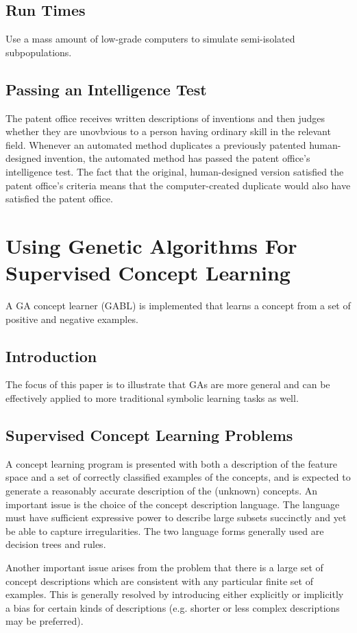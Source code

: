 \documentclass[12pt]{book}
\begin{document}
\section{Run Times}
Use a mass amount of low-grade computers to simulate semi-isolated subpopulations.

\section{Passing an Intelligence Test}
The patent office receives written descriptions of inventions and then judges whether they are unovbvious to a person having ordinary skill in the relevant field. Whenever an automated method duplicates a previously patented  human-designed invention, the automated method has passed the patent office's intelligence test. The fact that the original, human-designed version satisfied the patent office's criteria means that the computer-created duplicate would also have satisfied the patent office.
\clearpage

\chapter{Using Genetic Algorithms For Supervised Concept Learning}
A GA concept learner (GABL) is implemented that learns a concept from a set of positive and negative examples.

\section{Introduction}
The focus of this paper is to illustrate that GAs are more general and can be effectively applied to more traditional symbolic learning tasks as well.

\section{Supervised Concept Learning Problems}
A concept learning program is presented with both a description of the feature space and a set of correctly classified examples of the concepts, and is expected to generate a reasonably accurate description of the (unknown) concepts. An important issue is the choice of the concept description language. The language must have sufficient expressive power to describe large subsets succinctly and yet be able to capture irregularities. The two language forms generally used are decision trees and rules.

Another important issue arises from the problem that there is a large set of concept descriptions which are consistent with any particular finite set of examples. This is generally resolved  by introducing either explicitly or implicitly a bias for certain kinds of descriptions (e.g. shorter or less complex descriptions may be preferred).
\end{document}
